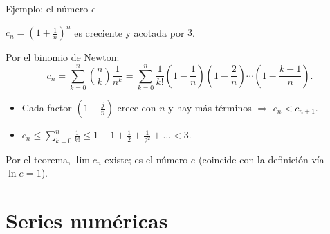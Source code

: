 \documentclass[10pt,aspectratio=169]{beamer}
\begin{document}
\begin{frame}{Ejemplo: el número $e$}
  \begin{ejemplo}
    $c_n=\left(1+\frac1n\right)^n$ es creciente y acotada por $3$.

    Por el binomio de Newton:
    \[ c_n=\sum_{k=0}^n\binom nk\frac1{n^k}=\sum_{k=0}^n\frac1{k!}\left(1-\frac1n\right)\left(1-\frac2n\right)\cdots\left(1-\frac{k-1}n\right). \]
    \begin{itemize}
      \item Cada factor $\left(1-\frac jn\right)$ crece con $n$ y hay más términos $\Rightarrow$ $c_n<c_{n+1}$.
      \item $c_n\le\displaystyle\sum_{k=0}^n\frac1{k!}\le1+1+\frac12+\frac1{2^2}+\dots<3$.
    \end{itemize}
    Por el teorema, $\lim c_n$ existe; es el número $e$ (coincide con la definición vía $\ln e=1$).
  \end{ejemplo}
\end{frame}

\section{Series numéricas}
\end{document}
